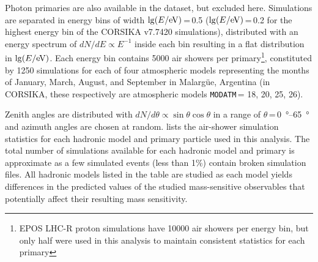 Photon primaries are also available in the dataset, but excluded here.
Simulations are separated in energy bins of width $\lg(E / \rm eV)$\,=\,0.5 ($\lg(E / \rm eV)$\,=\,0.2 for the highest energy bin of the CORSIKA v7.7420 simulations), distributed with an energy spectrum of $dN/dE \propto E^{-1}$ inside each bin resulting in a flat distribution in $\lg(E / \rm eV)$.
Each energy bin contains 5000 air showers per primary\footnote[3]{EPOS LHC-R proton simulations have 10000 air showers per energy bin, but only half were used in this analysis to maintain consistent statistics for each primary}, constituted by 1250 simulations for each of four atmospheric models representing the months of January, March, August, and September in Malarg\"ue, Argentina (in CORSIKA, these respectively are atmospheric models \texttt{MODATM}\,= 18, 20, 25, 26).

Zenith angles are distributed with $dN/d\theta \propto \sin\theta\cos\theta$ in a range of $\theta$\,=\,\qtyrange{0}{65}{\degree} and azimuth angles are chosen at random.
 lists the air-shower simulation statistics for each hadronic model and primary particle used in this analysis.
The total number of simulations available for each hadronic model and primary is approximate as a few simulated events (less than 1\%) contain broken simulation files.
All hadronic models listed in the table are studied as each model yields differences in the predicted values of the studied mass-sensitive observables that potentially affect their resulting mass sensitivity.

